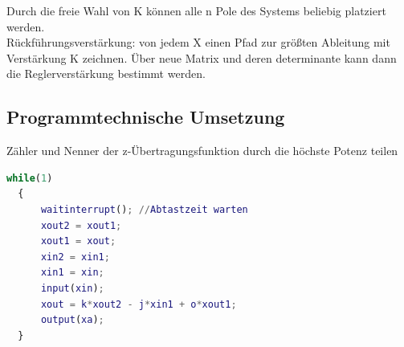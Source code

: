 \documentclass[10pt,a4paper]{article}
\begin{document}
Durch die freie Wahl von K können alle n Pole des Systems beliebig platziert werden.\\
Rückführungsverstärkung: von jedem X einen Pfad zur größten Ableitung mit Verstärkung K zeichnen.
Über neue Matrix und deren determinante kann dann die Reglerverstärkung bestimmt werden.

\subsection{Programmtechnische Umsetzung}
Zähler und Nenner der z-Übertragungsfunktion durch die höchste Potenz teilen

\begin{lstlisting}[language=Matlab]
  while(1)
  {
      waitinterrupt(); //Abtastzeit warten
      xout2 = xout1;
      xout1 = xout;
      xin2 = xin1;
      xin1 = xin;
      input(xin);
      xout = k*xout2 - j*xin1 + o*xout1;
      output(xa);
  }
\end{lstlisting}
\end{document}

